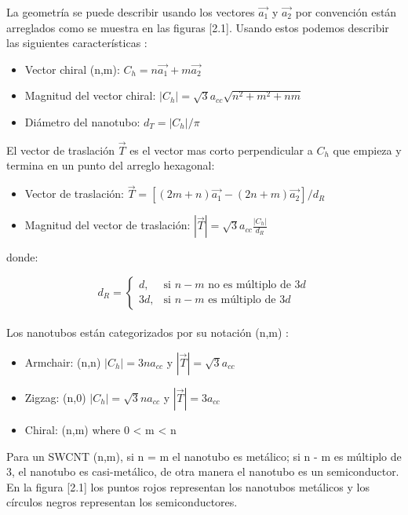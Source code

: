 La geometría se puede describir usando los vectores $\vec{a_1}$ y $\vec{a_2}$ por convención están arreglados como se muestra en las figuras [2.1]. Usando estos podemos describir las siguientes características \cite{Melendez2016}:\\

\begin{itemize}
    \item Vector chiral (n,m): $C_h = n\vec{a_1} + m\vec{a_2}$
    \item Magnitud del vector chiral: $\left|C_h\right| = \sqrt{3}a_{cc}\sqrt{n^2+m^2+nm}$
    \item Diámetro del nanotubo: $d_T = \left|C_h\right|/\pi$
\end{itemize}

El vector de traslación $\vec{T}$ es el vector mas corto perpendicular a $C_h$ que empieza y termina en un punto del arreglo hexagonal:

\begin{itemize}
    \item Vector de traslación: $\vec{T} = \left[\left(2m+n\right)\vec{a_1} - \left(2n+m\right)\vec{a_2}\right]/d_R$
    \item Magnitud del vector de traslación: $\left|\vec{T}\right|=\sqrt{3}a_{cc}\frac{\left|C_h\right|}{d_R}$
\end{itemize}

donde:

\begin{equation}\label{dR}
    d_R =
    \begin{cases} 
    d,& \text{si } n-m \text{ no es múltiplo de } 3d\\
    3d,& \text{si } n-m \text{ es múltiplo de } 3d
    \end{cases}
\end{equation}\\

Los nanotubos están categorizados por su notación (n,m) \cite{Melendez2016}:

\begin{itemize}
    \item Armchair: (n,n) $\left|C_h\right|=3na_{cc}$ y $\left|\vec{T}\right|=\sqrt{3}a_{cc}$
    \item Zigzag: (n,0) $\left|C_h\right|=\sqrt{3}na_{cc}$ y $\left|\vec{T}\right|=3a_{cc}$
    \item Chiral: (n,m) where 0 < m < n
\end{itemize}

Para un SWCNT (n,m), si n = m el nanotubo es metálico; si n - m es múltiplo de 3, el nanotubo es casi-metálico, de otra manera el nanotubo es un semiconductor. En la figura [2.1] los puntos rojos representan los nanotubos metálicos y los círculos negros representan los semiconductores.\\

